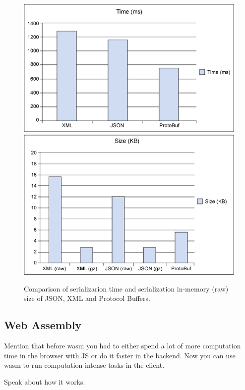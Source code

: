 \begin{enumerate}[a)]
	\begin{figure}[h!]
		\centering
    	\includegraphics[width=0.45\linewidth]{assets/images/protobuff-json-xml_rw.png}
    	\includegraphics[width=0.45\linewidth]{assets/images/protobuff-json-xml_size.png}
    	\caption{Comparison of serializarion time and serialization in-memory (raw) size of JSON, XML and Protocol Buffers. \cite{protobuff_json_xml}}
    	\label{fig:protobuff_json_xml}
	\end{figure}
	
 \end{enumerate}






\subsection{Web Assembly}
Mention that before wasm you had to either spend a lot of more computation time in the browser with JS or do it faster in the backend. Now you can use wasm to run computation-intense tasks in the client.

Speak about how it works.